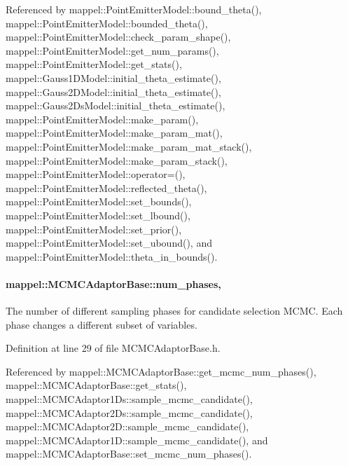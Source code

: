 Referenced by mappel\+::\+Point\+Emitter\+Model\+::bound\+\_\+theta(), mappel\+::\+Point\+Emitter\+Model\+::bounded\+\_\+theta(), mappel\+::\+Point\+Emitter\+Model\+::check\+\_\+param\+\_\+shape(), mappel\+::\+Point\+Emitter\+Model\+::get\+\_\+num\+\_\+params(), mappel\+::\+Point\+Emitter\+Model\+::get\+\_\+stats(), mappel\+::\+Gauss1\+D\+Model\+::initial\+\_\+theta\+\_\+estimate(), mappel\+::\+Gauss2\+D\+Model\+::initial\+\_\+theta\+\_\+estimate(), mappel\+::\+Gauss2\+Ds\+Model\+::initial\+\_\+theta\+\_\+estimate(), mappel\+::\+Point\+Emitter\+Model\+::make\+\_\+param(), mappel\+::\+Point\+Emitter\+Model\+::make\+\_\+param\+\_\+mat(), mappel\+::\+Point\+Emitter\+Model\+::make\+\_\+param\+\_\+mat\+\_\+stack(), mappel\+::\+Point\+Emitter\+Model\+::make\+\_\+param\+\_\+stack(), mappel\+::\+Point\+Emitter\+Model\+::operator=(), mappel\+::\+Point\+Emitter\+Model\+::reflected\+\_\+theta(), mappel\+::\+Point\+Emitter\+Model\+::set\+\_\+bounds(), mappel\+::\+Point\+Emitter\+Model\+::set\+\_\+lbound(), mappel\+::\+Point\+Emitter\+Model\+::set\+\_\+prior(), mappel\+::\+Point\+Emitter\+Model\+::set\+\_\+ubound(), and mappel\+::\+Point\+Emitter\+Model\+::theta\+\_\+in\+\_\+bounds().

\paragraph[{\texorpdfstring{num\+\_\+phases}{num_phases}}]{ mappel\+::\+M\+C\+M\+C\+Adaptor\+Base\+::num\+\_\+phases\hspace{0.3cm}{\ttfamily [protected]}, {\ttfamily [inherited]}}\hypertarget{classmappel_1_1MCMCAdaptorBase_a44b90a984ace712584074dc17831fe25}{}\label{classmappel_1_1MCMCAdaptorBase_a44b90a984ace712584074dc17831fe25}
The number of different sampling phases for candidate selection M\+C\+MC. Each phase changes a different subset of variables. 

Definition at line 29 of file M\+C\+M\+C\+Adaptor\+Base.\+h.



Referenced by mappel\+::\+M\+C\+M\+C\+Adaptor\+Base\+::get\+\_\+mcmc\+\_\+num\+\_\+phases(), mappel\+::\+M\+C\+M\+C\+Adaptor\+Base\+::get\+\_\+stats(), mappel\+::\+M\+C\+M\+C\+Adaptor1\+Ds\+::sample\+\_\+mcmc\+\_\+candidate(), mappel\+::\+M\+C\+M\+C\+Adaptor2\+Ds\+::sample\+\_\+mcmc\+\_\+candidate(), mappel\+::\+M\+C\+M\+C\+Adaptor2\+D\+::sample\+\_\+mcmc\+\_\+candidate(), mappel\+::\+M\+C\+M\+C\+Adaptor1\+D\+::sample\+\_\+mcmc\+\_\+candidate(), and mappel\+::\+M\+C\+M\+C\+Adaptor\+Base\+::set\+\_\+mcmc\+\_\+num\+\_\+phases().

